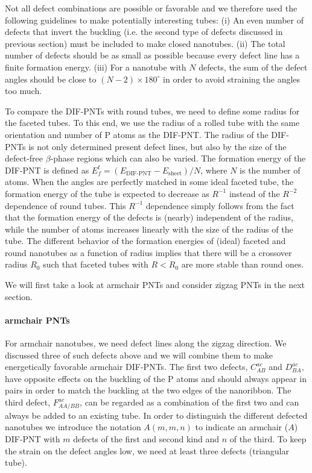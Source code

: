 Not all defect combinations are possible or favorable and we therefore used the following guidelines to make potentially interesting tubes: 
(i) An even number of defects that invert the buckling (i.e. the second type of defects discussed in previous section) must be included to make closed nanotubes. (ii) The total number of defects should  be as small as possible because every defect line has a finite formation energy. (iii) For a nanotube with $N$ defects, the sum of the defect angles should be close to $(N-2)\times 180^{\circ}$ in order to avoid straining the angles too much. 

To compare the DIF-PNTs with round tubes, we need to define some radius for the faceted tubes. To this end, we use the radius of a rolled tube with the same orientation and number of P atoms as the DIF-PNT. The radius of the DIF-PNTs is not only determined present defect lines, but also by the size of the defect-free $\beta$-phase regions which can also be varied. The formation energy of the DIF-PNT is defined as  $E_f^t=(E_{\text{DIF-PNT}}-E_{\text{sheet}})/N$, where $N$ is the number of atoms. When the angles are perfectly matched in some ideal faceted tube, the formation energy of the tube is expected to decrease as $R^{-1}$ instead of the $R^{-2}$ dependence of round tubes. This $R^{-1}$ dependence simply follows from the fact that the formation energy of the defects is (nearly) independent of the radius, while the number of atoms increases linearly with the size of the radius of the tube. The different behavior of the formation energies of (ideal) faceted and round nanotubes as a function of radius implies that there will be a crossover radius $R_0$ such that faceted tubes with $R<R_0$ are more stable than round ones.

We will first take a look at armchair PNTs and consider zigzag PNTs in the next section.





\paragraph*{armchair PNTs}
For armchair nanotubes, we need defect lines along the zigzag direction. We discussed three of such defects above and we will combine them to make energetically favorable armchair DIF-PNTs. The first two defects, $C_{AB}^{ac}$ and $D_{BA}^{ac}$, have opposite effects on the buckling of the P atoms and should always appear in pairs in order to match the buckling at the two edges of the nanoribbon. The third defect, $F_{AA/BB}^{ac}$, can be regarded as a combination of the first two and can always be added to an existing tube. In order to distinguish the different defected nanotubes we introduce the notation $A(m,m,n)$ to indicate an armchair ($A$) DIF-PNT with $m$ defects of the first and second kind and $n$ of the third. To keep the strain on the defect angles low, we need at least three defects (triangular tube). 


